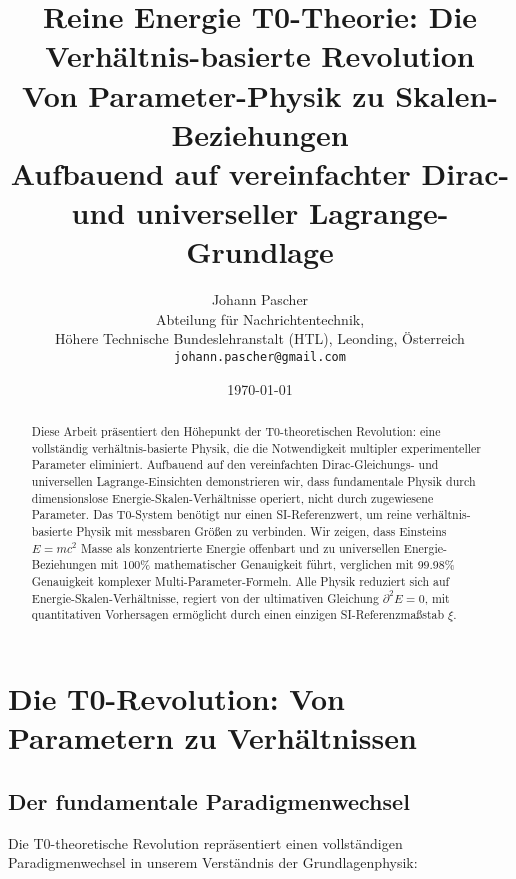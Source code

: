 \documentclass[12pt,a4paper]{article}
\title{Reine Energie T0-Theorie: Die Verhältnis-basierte Revolution \\
	Von Parameter-Physik zu Skalen-Beziehungen \\
	\large Aufbauend auf vereinfachter Dirac- und universeller Lagrange-Grundlage}
\author{Johann Pascher\\
	Abteilung für Nachrichtentechnik, \\Höhere Technische Bundeslehranstalt (HTL), Leonding, Österreich\\
	\texttt{johann.pascher@gmail.com}}
\date{\today}
\newcommand{\Efield}{E}
\newcommand{\xipar}{\xi}
\theoremstyle{definition}
\theoremstyle{remark}
\begin{document}
	
	\maketitle
	
	\begin{abstract}
		Diese Arbeit präsentiert den Höhepunkt der T0-theoretischen Revolution: eine vollständig verhältnis-basierte Physik, die die Notwendigkeit multipler experimenteller Parameter eliminiert. Aufbauend auf den vereinfachten Dirac-Gleichungs- und universellen Lagrange-Einsichten demonstrieren wir, dass fundamentale Physik durch dimensionslose Energie-Skalen-Verhältnisse operiert, nicht durch zugewiesene Parameter. Das T0-System benötigt nur einen SI-Referenzwert, um reine verhältnis-basierte Physik mit messbaren Größen zu verbinden. Wir zeigen, dass Einsteins $E = mc^2$ Masse als konzentrierte Energie offenbart und zu universellen Energie-Beziehungen mit 100\% mathematischer Genauigkeit führt, verglichen mit 99.98\% Genauigkeit komplexer Multi-Parameter-Formeln. Alle Physik reduziert sich auf Energie-Skalen-Verhältnisse, regiert von der ultimativen Gleichung $\partial^2 \Efield = 0$, mit quantitativen Vorhersagen ermöglicht durch einen einzigen SI-Referenzmaßstab $\xipar$.
	\end{abstract}
	
	\tableofcontents
	\newpage
	
	\section{Die T0-Revolution: Von Parametern zu Verhältnissen}
	
	\subsection{Der fundamentale Paradigmenwechsel}
	
	Die T0-theoretische Revolution repräsentiert einen vollständigen Paradigmenwechsel in unserem Verständnis der Grundlagenphysik:
	
\end{document}
